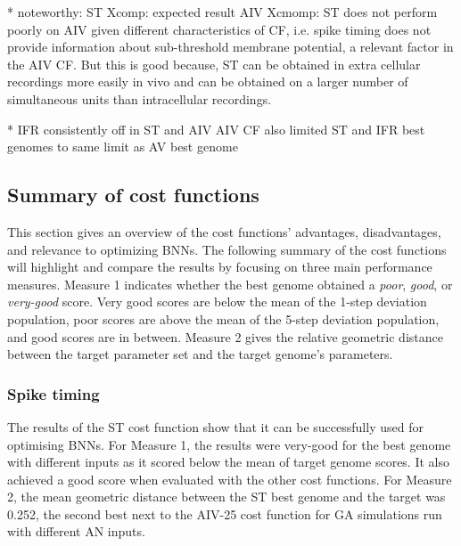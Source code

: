 * noteworthy: ST Xcomp: expected result AIV Xcmomp: ST does not
perform poorly on AIV given different characteristics of CF,
i.e. spike timing does not provide information about
sub-threshold membrane potential, a relevant factor in the AIV
CF.  But this is good because, ST can be obtained in extra
cellular recordings more easily in vivo and can be obtained on a larger
number of simultaneous units than intracellular recordings.


*       IFR consistently off in ST and AIV
AIV CF also limited  ST and IFR best genomes to same limit as AV best genome 



\subsection{Summary of cost functions}\label{sec:GA:summ-cost-funct}

This section gives an overview of the cost functions' advantages, disadvantages,
and relevance to optimizing BNNs. The following summary of the cost functions
will highlight and compare the results by focusing on three main performance
measures.  Measure 1 indicates whether the best genome obtained a \textit{poor},
\textit{good}, or \textit{very-good} score. Very good scores are below the mean
of the 1-step deviation population, poor scores are above the mean of the 5-step
deviation population, and good scores are in between.  %
Measure 2 gives the relative geometric distance between the target
parameter set and the target genome's parameters.

\subsubsection{Spike timing}\label{sec:GA:spike-timing-summ}

The results of the ST cost function show that it can be successfully used for
optimising BNNs.  For Measure 1, the results were very-good for the best genome
with different inputs as it scored below the mean of target genome scores. It
also achieved a good score when evaluated with the other cost functions.  For
Measure 2, the mean geometric distance between the ST best genome and the target
was 0.252, the second best next to the AIV-25 cost function for GA simulations
run with different AN inputs.

